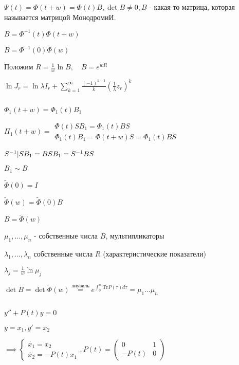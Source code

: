 \documentclass[12pt, a4paper]{article}
\begin{document}
    $\Psi(t) = \Phi(t+w) = \Phi(t)B, \det B \neq 0, B$ - какая-то матрица,
    которая называется матрицой МонодромиИ.

    $B = \Phi^{-1}(t)\Phi(t+w)$

    $B = \Phi^{-1}(0)\Phi(w)$

    Положим $R = \frac{1}{w}\ln B, \quad B = e^{wR}$


    $\ln J_{r} = \ln \lambda I_r + \sum^\infty_{k=1}\frac{(-1)^{k-1}}{k} (
        \frac{1}{\lambda}z_r
    )^k$
    
    \par $ $

    $\boxed {\Phi_1(t+ w) = \Phi_1(t)B_1}$

    $\Pi_1(t+w) = \begin{array}{ll}
        \Phi(t) S B_1  = \Phi_1(t)BS\\
        \Phi_1(t)B_1 = \Phi(t+w)S = \Phi_1(t)BS
    \end{array}$ 

    $S^{-1}|SB_1 = BS \\ 
    B_1 = S^{-1}BS$

    $B_1 \sim B$

    $\widetilde{\Phi}(0) = I $

    $\widetilde{\Phi}(w) = \widetilde{\Phi}(0)B$

    $B = \widetilde{\Phi}(w)$

    $\mu_1, \dotsc, \mu_n$ - собственные числа $B$, мультипликаторы

    $\lambda_1, \dotsc, \lambda_n$ собственные числа $R$ (характеристические показатели)

    $\boxed{\lambda_j = \frac{1}{w}\ln \mu_j}$

    $\det B = \det \widetilde{\Phi}(w) \overset{\text{лиувиль}}{=} 
    e^{\int^w_0 \text{Tr}P(\tau)d\tau} = \mu_1 \dotsc \mu_n$

    \par $ $

    $y'' + P(t)y = 0$

    $y = x_1, y' = x_2$

    $\implies \begin{cases}
        \dot{x_1} = x_2 \\ \dot{x_2} = -P(t)x_1
    \end{cases}, P(t) = \begin{pmatrix}
        0 & 1 \\ -P(t) & 0 
    \end{pmatrix}$ 
\end{document}
